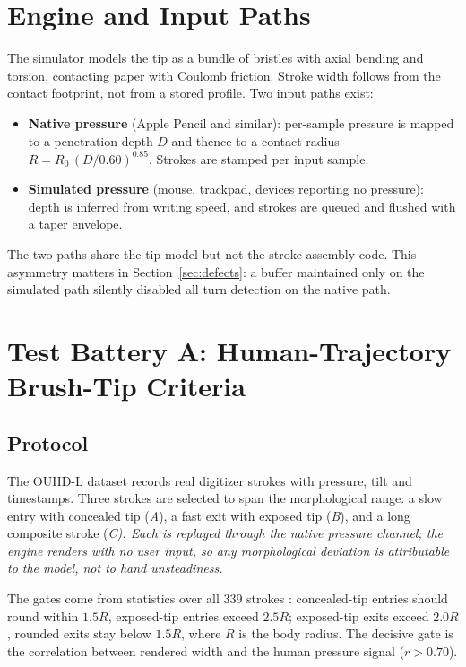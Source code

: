 \documentclass[conference]{IEEEtran}
\begin{document}
\section{Engine and Input Paths}

The simulator models the tip as a bundle of bristles with axial bending and
torsion, contacting paper with Coulomb friction. Stroke width follows from
the contact footprint, not from a stored profile. Two input paths exist:

\begin{itemize}
\item \textbf{Native pressure} (Apple Pencil and similar): per-sample pressure
is mapped to a penetration depth $D$ and thence to a contact radius
$R=R_0\,(D/0.60)^{0.85}$. Strokes are stamped per input sample.
\item \textbf{Simulated pressure} (mouse, trackpad, devices reporting no
pressure): depth is inferred from writing speed, and strokes are queued and
flushed with a taper envelope.
\end{itemize}

The two paths share the tip model but not the stroke-assembly code. This
asymmetry matters in Section~\ref{sec:defects}: a buffer maintained only on
the simulated path silently disabled all turn detection on the native path.

\section{Test Battery A: Human-Trajectory Brush-Tip Criteria}
\label{sec:batteryA}

\subsection{Protocol}

The OUHD-L dataset records real digitizer strokes with pressure, tilt and
timestamps. Three strokes are selected to span the morphological range:
a slow entry with concealed tip (\emph{A}), a fast exit with exposed tip
(\emph{B}), and a long composite stroke (\em{C}). Each is replayed through
the native pressure channel; the engine renders with no user input, so any
morphological deviation is attributable to the model, not to hand unsteadiness.

The gates come from statistics over all 339 strokes
\cite{ouhdl2019}: concealed-tip entries should round within $1.5R$,
exposed-tip entries exceed $2.5R$; exposed-tip exits exceed $2.0R$, rounded
exits stay below $1.5R$, where $R$ is the body radius. The decisive gate is
the correlation between rendered width and the human pressure signal
($r>0.70$).
\end{document}
